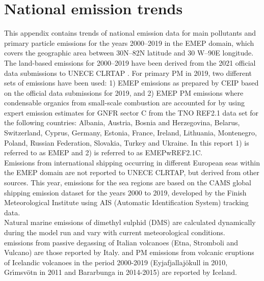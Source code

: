 \setcounter{page}{1}

\cleardoublepage
\chapter[Emission trends]{National emission trends}
\label{ch:appx_emis_trends}

This appendix contains trends of national emission data for main
pollutants and   primary particle emissions for the years
2000--2019 in the EMEP domain, which covers the geographic area between 30\degrees N--82\degrees N latitude and 30\degrees   
W--90\degrees E longitude.\\

The land-based emissions for 2000--2019  have been derived from the  2021 official data submissions to UNECE CLRTAP \citep{CEIP2021}.
For primary PM in 2019, two different sets of emissions have been used: 1) EMEP emissions as prepared by CEIP based on the official data submissions
for 2019, and 2) EMEP PM emissions where condensable organics from small-scale combustion are accounted for by using expert emission estimates for GNFR sector C from the
TNO REF2.1 data set for the following countries: Albania, Austria, Bosnia and Herzegovina,
Belarus, Switzerland, Cyprus, Germany, Estonia, France, Ireland, Lithuania, Montenegro,
Poland, Russian Federation, Slovakia, Turkey and Ukraine. In this report 1) is referred to as EMEP and 2) is referred to as EMEPwREF2.1C.\\

Emissions from international shipping occurring in different European seas within the EMEP domain are not reported to UNECE CLRTAP, but derived from other sources. This year, emissions for the sea regions are based on the CAMS global shipping emission dataset \citep{CAMSemis2019,ECCAD} for the years 2000 to 2019, developed by the Finish Meteorological Institute using AIS (Automatic Identification System) tracking data.\\

Natural marine emissions of dimethyl sulphid (DMS) are calculated dynamically during the model run and vary with current meteorological conditions.\\

\sox emissions from passive degassing of Italian volcanoes (Etna,
Stromboli and Vulcano) are those reported by
Italy. \sox and PM emissions from volcanic eruptions of Icelandic volcanoes in the period 2000-2019 (Eyjafjallaj\"okull in 2010, Gr{\'{\i}}msv{\"{o}}tn in 2011  and  Bar\dh{}arbunga in 2014-2015) are reported by Iceland.  \\


